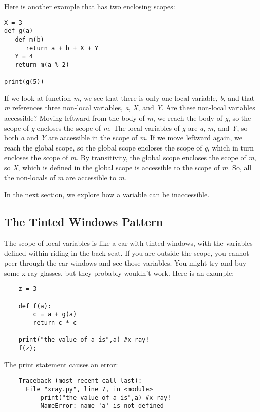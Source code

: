 Here is another example that has two enclosing scopes:

\begin{verbatim}
X = 3
def g(a)
   def m(b)
      return a + b + X + Y
   Y = 4
   return m(a % 2)

print(g(5))
\end{verbatim}

If we look at function {\it m}, we see that there is only
one local variable, {\it b}, and that {\it m} references three
non-local variables,
{\it a}, {\it X}, and {\it Y}. 
Are these non-local variables accessible?
Moving leftward from the body of {\it m}, we reach the body of {\it g},
so the scope of {\it g} encloses the scope of {\it m}. The local variables
of {\it g} are {\it a}, {\it m}, and {\it Y}, so both {\it a} and {\it Y}
are accessible in the scope of {\it m}.
If we move leftward again, we reach the global scope,
so the global scope encloses the scope of {\it g}, which in turn encloses
the scope of {\it m}. By transitivity, the global scope encloses
the scope of {\it m}, so {\it X}, which is defined in the global scope
is accessible to the scope of {\it m}.
So, all the non-locals of {\it m} are accessible to {\it m}.

In the next section, we explore how a variable can be
inaccessible.

\subsection{The Tinted Windows Pattern}

The scope of local variables is like a car with tinted
windows, with the variables defined within riding in
the back seat.
If you are outside the scope, you cannot
peer through the car windows  and see those variables.
You might try and buy some x-ray glasses, but they
probably wouldn't work.
Here is an example:

\begin{verbatim}
    z = 3

    def f(a):
        c = a + g(a)
        return c * c

    print("the value of a is",a) #x-ray!
    f(z);
\end{verbatim}

The print statement causes an error:

\begin{verbatim}
    Traceback (most recent call last):
      File "xray.py", line 7, in <module>
          print("the value of a is",a) #x-ray!
          NameError: name 'a' is not defined
\end{verbatim}

